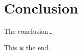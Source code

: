 \documentclass[a4paper,12pt]{article}
\newcommand{\basepath}{.}
\newcommand{\imagepath}{\basepath/images}
\newcommand{\pdftextpath}{\basepath/pdftex_t}
\newcommand{\pn}{\par\noindent}
\begin{document}


\section{Conclusion}

\pn The conclusion\dots


\pn This is the end.
\end{document}
